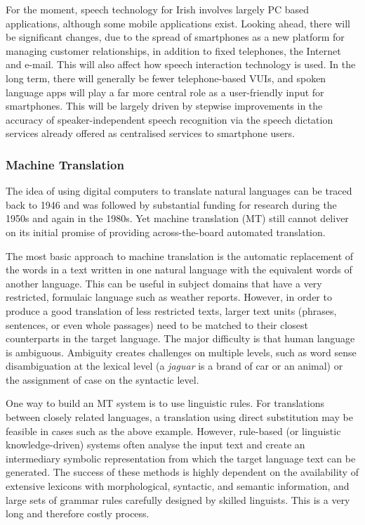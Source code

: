 \begin{multicols}{2}
For the moment, speech technology for Irish involves largely PC based applications, although some mobile applications exist. Looking ahead, there will be significant changes, due to the spread of smartphones as a new platform for managing customer relationships, in addition to fixed telephones, the Internet and e-mail. This will also affect how speech interaction technology is used. In the long term, there will generally be fewer telephone-based VUIs, and spoken language apps will play a far more central role as a user-friendly input for smartphones. This will be largely driven by stepwise improvements in the accuracy of speaker-independent speech recognition via the speech dictation services already offered as centralised services to smartphone users.

\subsubsection{Machine Translation}

The idea of using digital computers to translate natural languages can be traced back to 1946 and was followed by substantial funding for research during the 1950s and again in the 1980s. 
Yet machine translation (MT) still cannot deliver on its initial promise of providing across-the-board automated translation.  


The most basic approach to machine translation is the automatic replacement of the words in a text written in one natural language with the equivalent words of another language. This can be useful in subject domains that have a very restricted, formulaic language such as weather reports. However, in order to produce a good translation of less restricted texts, larger text units (phrases, sentences, or even whole passages) need to be matched to their closest counterparts in the target language. The major difficulty is that human language is ambiguous. Ambiguity creates challenges on multiple levels, such as word sense disambiguation at the lexical level (a \textit{jaguar} is a brand of car or an animal) or the assignment of case on the syntactic level.

One way to build an MT system is to use linguistic rules. For translations between closely related languages, a translation using direct substitution may be feasible in cases such as the above example. However, rule-based (or linguistic knowledge-driven) systems often analyse the input text and create an intermediary symbolic representation from which the target language text can be generated. The success of these methods is highly dependent on the availability of extensive lexicons with morphological, syntactic, and semantic information, and large sets of grammar rules carefully designed by skilled linguists. This is a very long and therefore costly process.


\end{multicols}
